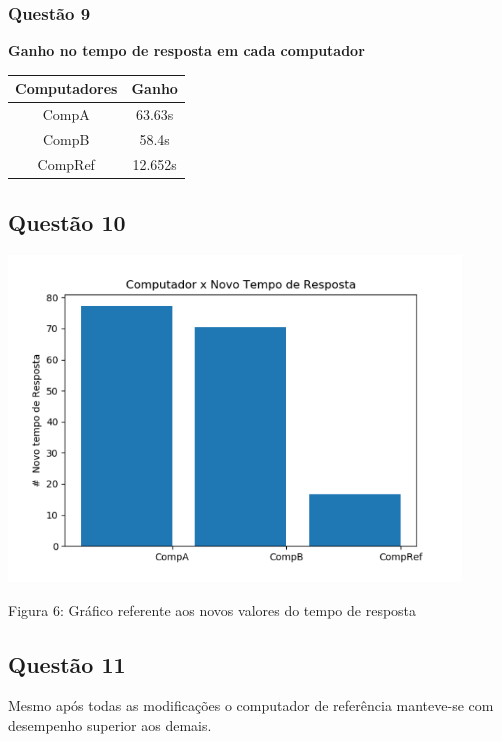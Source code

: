 \subsubsection{Questão 9}
\vspace{0.5cm}
\begin{center}
    \vspace{0.2cm}
    \centering
    \begin{small}
         \textbf{Ganho no tempo de resposta em cada computador} \label{Tabela1}
        \hline
         \vspace{0.5cm}
            \begin{tabular}{|c|c|}
            \hline
            Computadores            & Ganho\\
            \hline
            CompA             & 63.63s\\
            CompB             & 58.4s\\
            CompRef             & 12.652s\\
            \hline
        \end{tabular}
    \end{small}
\end{center}
\subsection{Questão 10}
\centerline{\includegraphics[width=120mm]{images/new_gain.png}}
\centerline{Figura 6: Gráfico referente aos novos valores do tempo de resposta}
\vspace{0.5cm}
\subsection{Questão 11}
Mesmo após todas as modificações o computador de referência manteve-se com desempenho superior aos demais.
